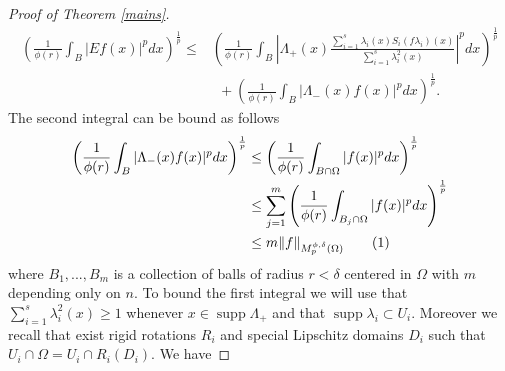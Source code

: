 \documentclass[12pt]{article}
\theoremstyle{definition}
\DeclareMathOperator\supp{supp}
\newcommand\addtag{\refstepcounter{equation}\tag{\theequation}}
\begin{document}
\begin{proof}[Proof of Theorem \ref{mains}]
\begin{align*}
\left( \frac{1}{\phi(r)} \int_B |Ef(x)|^pdx \right)^\frac{1}{p} \le & \left( \frac{1}{\phi(r)} \int_B \left|\Lambda_+(x) \frac{\sum_{i=1}^s \lambda_i(x)S_i(f\lambda_i)(x)}{\sum_{i=1}^s \lambda_i^2(x)}\right|^pdx \right)^\frac{1}{p} \\
&\ \ +\left( \frac{1}{\phi(r)} \int_B |\Lambda_-(x)f(x) |^pdx \right)^\frac{1}{p}.
\end{align*}
The second integral can be bound as follows
\begin{align*}
\left( \frac{1}{\phi(r)} \int_B |\Lambda_-(x)f(x) |^pdx \right)^\frac{1}{p}&\le\left( \frac{1}{\phi(r)} \int_{B\cap\Omega} |f(x) |^pdx \right)^\frac{1}{p} \\
& \le \sum_{j=1}^m \left( \frac{1}{\phi(r)} \int_{B_j\cap\Omega} |f(x) |^pdx \right)^\frac{1}{p}\\
&\le m\|f\|_{M_p^{\phi,\delta}(\Omega)} \addtag \label{ezbound}
\end{align*}
where $B_1,...,B_m$ is a collection of balls of radius $r<\delta$ centered in $\Omega$ with $m$ depending only on $n.$ To bound the first integral we will use that $\sum_{i=1}^s \lambda_i^2(x)\ge 1$ whenever $x \in \supp \Lambda_+$ and that $\supp \lambda_i \subset U_i$. Moreover we recall that exist rigid rotations $R_i$ and special Lipschitz domains $D_i$ such that $U_i\cap \Omega=U_i\cap R_i(D_i)$. We have


\end{proof}
\end{document}
